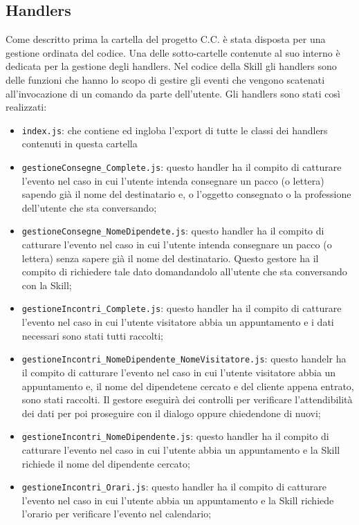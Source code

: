 \subsection{Handlers}
Come descritto prima la cartella del progetto C.C. è stata disposta per una gestione ordinata del codice. Una delle sotto-cartelle contenute al suo interno è dedicata per la gestione degli handlers. Nel codice della Skill gli handlers sono delle funzioni che hanno lo scopo di gestire gli eventi che vengono scatenati all'invocazione di un comando da parte dell'utente. Gli handlers sono stati così realizzati:
\begin{itemize}
    \item \texttt{index.js}: che contiene ed ingloba l'export di tutte le classi dei handlers contenuti in questa cartella
    
    \item \texttt{gestioneConsegne\_Complete.js}: questo handler ha il compito di catturare l'evento nel caso in cui l'utente intenda consegnare un pacco (o lettera) sapendo già il nome del destinatario e, o l'oggetto consegnato o la professione dell'utente che sta conversando;
    \item \texttt{gestioneConsegne\_NomeDipendete.js}: questo handler ha il compito di catturare l'evento nel caso in cui l'utente intenda consegnare un pacco (o lettera) senza sapere già il nome del destinatario. Questo gestore ha il compito di richiedere tale dato domandandolo all'utente che sta conversando con la Skill;
    \item \texttt{gestioneIncontri\_Complete.js}: questo handler ha il compito di catturare l'evento nel caso in cui l'utente visitatore abbia un appuntamento e i dati necessari sono stati tutti raccolti;
    \item \texttt{gestioneIncontri\_NomeDipendente\_NomeVisitatore.js}: questo handelr ha il compito di catturare l'evento nel caso in cui l'utente visitatore abbia un appuntamento e, il nome del dipendetene cercato e del cliente appena entrato, sono stati raccolti. Il gestore eseguirà dei controlli per verificare l'attendibilità dei dati per poi proseguire con il dialogo oppure chiedendone di nuovi;
    \item \texttt{gestioneIncontri\_NomeDipendente.js}: questo handler ha il compito di catturare l'evento nel caso in cui l'utente abbia un appuntamento e la Skill richiede il nome del dipendente cercato;
    \item \texttt{gestioneIncontri\_Orari.js}: questo handler ha il compito di catturare l'evento nel caso in cui l'utente abbia un appuntamento e la Skill richiede l'orario per verificare l'evento nel calendario;

\end{itemize}
